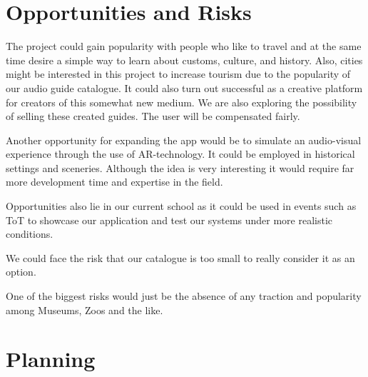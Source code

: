 \documentclass[12pt]{article}
\theoremstyle{definition}
\newenvironment{text}{
}{}
\begin{document}
\section{Opportunities and Risks}
\begin{text}
The project could gain popularity with people who like to travel and at the same time desire a simple way to learn about customs, culture, and history.
Also, cities might be interested in this project to increase tourism due to the popularity of our audio guide catalogue.
It could also turn out successful as a creative platform for creators of this somewhat new medium. We are also exploring the possibility of selling these created guides. The user will be compensated fairly.\newline
 
Another opportunity for expanding the app would be to simulate an audio-visual experience through the use of AR-technology. It could be employed in historical settings and sceneries. Although the idea is very interesting it would require far more development time and expertise in the field.\newline

Opportunities also lie in our current school as it could be used in events such as ToT to showcase our application and test our systems under more realistic conditions.
 
We could face the risk that our catalogue is too small to really consider it as an option.\newline 
 
One of the biggest risks would just be the absence of any traction and popularity among Museums, Zoos and the like. \newline
 
\end{text}
 
\pagebreak
\section{Planning}
\end{document}
